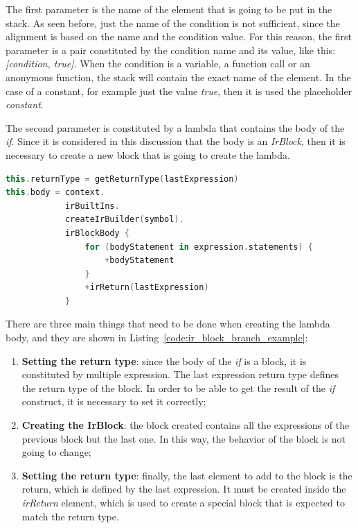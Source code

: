 The first parameter is the name of the element that is going to be put in the stack. As seen before, just the name of the condition is not sufficient, since the alignment is based on the name and the condition value. For this reason, the first parameter is a pair constituted by the condition name and its value, like this: \textit{[condition, true]}.\newline
When the condition is a variable, a function call or an anonymous function, the stack will contain the exact name of the element. In the case of a constant, for example just the value \textit{true}, then it is used the placeholder \textit{constant}.

The second parameter is constituted by a lambda that contains the body of the \textit{if}. Since it is considered in this discussion that the body is an \textit{IrBlock}, then it is necessary to create a new block that is going to create the lambda.
\begin{lstlisting}[caption={Creation of the lambda body when modifying a \textit{IrBranch}}, captionpos=b, language=Kotlin, label={code:ir_block_branch_example}]
this.returnType = getReturnType(lastExpression)
this.body = context.
            irBuiltIns.
            createIrBuilder(symbol).
            irBlockBody {
                for (bodyStatement in expression.statements) { 
                    +bodyStatement 
                }
                +irReturn(lastExpression)
            }
\end{lstlisting}
There are three main things that need to be done when creating the lambda body, and they are shown in Listing~\ref{code:ir_block_branch_example}:
\begin{enumerate}
    \item \textbf{Setting the return type}: since the body of the \textit{if} is a block, it is constituted by multiple expression. The last expression return type defines the return type of the block. In order to be able to get the result of the \textit{if} construct, it is necessary to set it correctly;
    \item \textbf{Creating the IrBlock}: the block created contains all the expressions of the previous block but the last one. In this way, the behavior of the block is not going to change;
    \item \textbf{Setting the return type}: finally, the last element to add to the block is the return, which is defined by the last expression. It must be created inside the \textit{irReturn} element, which is used to create a special block that is expected to match the return type.
\end{enumerate}

